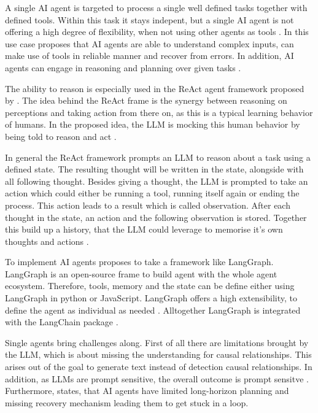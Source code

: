\documentclass[a4paper,oneside,bibliography=totoc]{scrbook}
\begin{document}
A single \ac{AI} agent is targeted to process a single well defined tasks together with defined tools. Within this task it stays indepent, but a single \ac{AI} agent is not offering a high degree of flexibility, when not using other agents as tools \cite{Sapkota2025}. In this use case \citet{Anthropic2024} proposes that \ac{AI} agents are able to understand complex inputs, can make use of tools in reliable manner and recover from errors. In addition, \ac{AI} agents can engage in reasoning and planning over given tasks \cite{Anthropic2024}.

The ability to reason is especially used in the ReAct agent framework proposed by \citet{Yao2023}. The idea behind the ReAct frame is the synergy between reasoning on perceptions and taking action from there on, as this is a typical learning behavior of humans. In the proposed idea, the \ac{LLM} is mocking this human behavior by being told to reason and act \cite{Yao2023}.

In general the ReAct framework prompts an \ac{LLM} to reason about a task using a defined state. The resulting thought will be written in the state, alongside with all following thought. Besides giving a thought, the \ac{LLM} is prompted to take an action which could either be running a tool, running itself again or ending the process. This action leads to a result which is called observation. After each thought in the state, an action and the following observation is stored. Together this build up a history, that the \ac{LLM} could leverage to memorise it's own thoughts and actions \cite{Yao2023}.

To implement \ac{AI} agents \citet{Anthropic2024} proposes to take a framework like LangGraph. LangGraph is an open-source frame to build agent with the whole agent ecosystem. Therefore, tools, memory and the state can be define either using LangGraph in python or JavaScript. LangGraph offers a high extensibility, to define the agent as individual as needed \cite{LangChain2025}. Alltogether LangGraph is integrated with the LangChain package \cite{LangChain2025a}.

Single agents bring challenges along. First of all there are limitations brought by the \ac{LLM}, which is about missing the understanding for causal relationships. This arises out of the goal to generate text instead of detection causal relationships. In addition, as \acp{LLM} are prompt sensitive, the overall outcome is prompt sensitve \cite{Sapkota2025}. Furthermore, \citet{Sapkota2025} states, that \ac{AI} agents have limited long-horizon planning and missing recovery mechanism leading them to get stuck in a loop.
\end{document}
